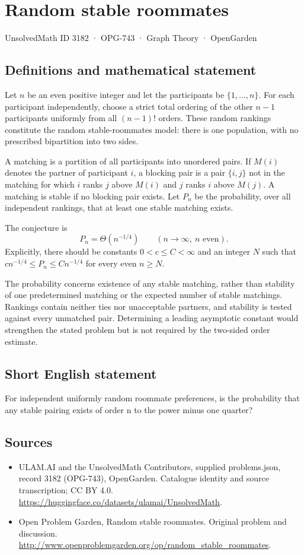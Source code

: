 \documentclass[11pt,a4paper]{article}
\begin{document}
\section*{Random stable roommates}\label{3182}
{\small UnsolvedMath ID 3182 · OPG-743 · Graph Theory · OpenGarden}
\subsection{Definitions and mathematical statement}
Let $n$ be an even positive integer and let the participants be $\{1,\ldots,n\}$. For each participant independently, choose a strict total ordering of the other $n-1$ participants uniformly from all $(n-1)!$ orders. These random rankings constitute the random stable-roommates model: there is one population, with no prescribed bipartition into two sides.

A matching is a partition of all participants into unordered pairs. If $M(i)$ denotes the partner of participant $i$, a blocking pair is a pair $\{i,j\}$ not in the matching for which $i$ ranks $j$ above $M(i)$ and $j$ ranks $i$ above $M(j)$. A matching is stable if no blocking pair exists. Let $P_n$ be the probability, over all independent rankings, that at least one stable matching exists.

The conjecture is
\[
                         P_n=\Theta(n^{-1/4})
       \qquad(n\longrightarrow\infty,\ n\text{ even}).
\]
Explicitly, there should be constants $0<c\le C<\infty$ and an integer $N$ such that $c n^{-1/4}\le P_n\le C n^{-1/4}$ for every even $n\ge N$.

The probability concerns existence of any stable matching, rather than stability of one predetermined matching or the expected number of stable matchings. Rankings contain neither ties nor unacceptable partners, and stability is tested against every unmatched pair. Determining a leading asymptotic constant would strengthen the stated problem but is not required by the two-sided order estimate.
\subsection{Short English statement}
For independent uniformly random roommate preferences, is the probability that any stable pairing exists of order n to the power minus one quarter?
\subsection{Sources}
\begin{itemize}
\item[S1] ULAM.AI and the UnsolvedMath Contributors, supplied problems.json, record 3182 (OPG-743), OpenGarden. Catalogue identity and source transcription; CC BY 4.0.
\url{https://huggingface.co/datasets/ulamai/UnsolvedMath}.
\item[S2] Open Problem Garden, Random stable roommates. Original problem and discussion.
\url{http://www.openproblemgarden.org/op/random_stable_roommates}.
\end{itemize}
\end{document}
